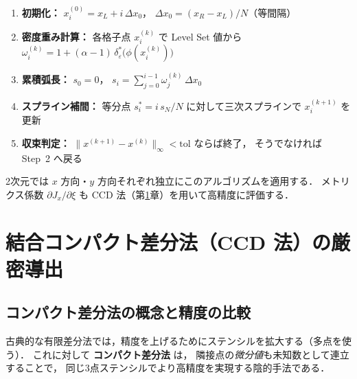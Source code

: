 \documentclass[12pt, a4paper, titlepage]{article}
\newcommand{\jp}[1]{{\normalfont\jpfont #1}}
\newcommand{\de}{\delta_\varepsilon}
\begin{document}
\begin{tcolorbox}[algbox, title={\jp{界面適合格子生成アルゴリズム}}]
\begin{enumerate}[label=\textbf{Step~\arabic*.}, leftmargin=*, itemsep=4pt]
  \item \jp{\textbf{初期化：}
        $x_i^{(0)} = x_L + i\,\Delta x_0$，
        $\Delta x_0 = (x_R-x_L)/N$（等間隔）}

  \item \jp{\textbf{密度重み計算：}
        各格子点 $x_i^{(k)}$ で Level Set 値から
        $\omega_i^{(k)} = 1 + (\alpha-1)\,\de^*\!\bigl(\phi(x_i^{(k)})\bigr)$}

  \item \jp{\textbf{累積弧長：}
        $s_0 = 0$，
        $s_i = \displaystyle\sum_{j=0}^{i-1}\omega_j^{(k)}\,\Delta x_0$}

  \item \jp{\textbf{スプライン補間：}
        等分点 $s_i^* = i\,s_N/N$ に対して三次スプラインで $x_i^{(k+1)}$ を更新}

  \item \jp{\textbf{収束判定：}
        $\|x^{(k+1)} - x^{(k)}\|_\infty < \mathrm{tol}$ ならば終了，
        そうでなければ Step~2 へ戻る}
\end{enumerate}
\jp{2次元では $x$ 方向・$y$ 方向それぞれ独立にこのアルゴリズムを適用する．
メトリクス係数 $\partial J_x/\partial\xi$ も CCD 法（第\ref{sec:CCD}章）を用いて高精度に評価する．}
\end{tcolorbox}


\section{\jp{結合コンパクト差分法（CCD 法）の厳密導出}}
\label{sec:CCD}

\subsection{\jp{コンパクト差分法の概念と精度の比較}}

\jp{古典的な有限差分法では，精度を上げるためにステンシルを拡大する（多点を使う）．
これに対して \textbf{コンパクト差分法} は，
隣接点の\emph{微分値}も未知数として連立することで，
同じ3点ステンシルでより高精度を実現する陰的手法である．}
\end{document}
